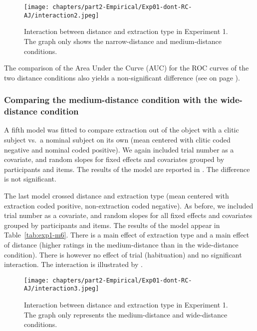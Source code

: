 

\begin{figure}
    \centering
    \texttt{[image: chapters/part2-Empirical/Exp01-dont-RC-AJ/interaction2.jpeg]}
    \caption{Interaction between distance and extraction type in Experiment 1. The graph only shows the narrow-distance and medium-distance conditions.}
    \label{fig:exp01-interaction2}
\end{figure}

The comparison of the Area Under the Curve (AUC) for the ROC curves of the two distance conditions also yields a non-significant difference (see  on page \pageref{fig:exp01-ROC}).

\subsubsection{Comparing the medium-distance condition with the wide-distance condition}

A fifth model was fitted to compare extraction out of the object with a clitic subject vs.\ a nominal subject on its own (mean centered with clitic coded negative and nominal coded positive). We again included trial number as a covariate, and random slopes for fixed effects and covariates grouped by participants and items. The results of the model are reported in . 
The difference is not significant.



The last model crossed distance and extraction type (mean centered with extraction coded positive, non-extraction coded negative). As before, we included trial number as a covariate, and random slopes for all fixed effects and covariates grouped by participants and items. The results of the model appear in Table~\ref{tab:exp1-m6}. 
There is a main effect of extraction type and a main effect of distance (higher ratings in the medium-distance than in the wide-distance condition). There is however no effect of trial (habituation) and no significant interaction. The interaction is illustrated by . 



\begin{figure}
    \centering
    \texttt{[image: chapters/part2-Empirical/Exp01-dont-RC-AJ/interaction3.jpeg]}
    \caption{Interaction between distance and extraction type in Experiment 1. The graph only represents the medium-distance and wide-distance conditions.}
    \label{fig:exp01-interaction3}
\end{figure}

